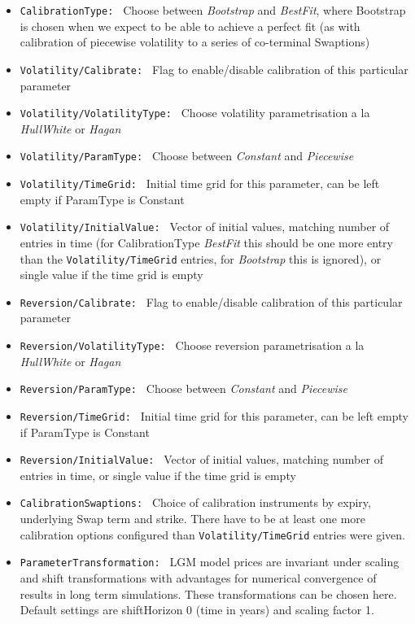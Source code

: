 \documentclass[12pt, a4paper]{article}
\begin{document}
{\begin{itemize}
\item {\tt CalibrationType: } Choose between {\em Bootstrap} and {\em BestFit}, where Bootstrap is chosen when we expect
to be able to achieve a perfect fit (as with calibration of piecewise volatility to a series of co-terminal Swaptions)
\item {\tt Volatility/Calibrate: } Flag to enable/disable calibration of this particular parameter
\item {\tt Volatility/VolatilityType: } Choose volatility parametrisation a la {\em HullWhite} or {\em Hagan}
\item {\tt Volatility/ParamType: } Choose between {\em Constant} and {\em Piecewise}
\item {\tt Volatility/TimeGrid: } Initial time grid for this parameter, can be left empty if ParamType is Constant
\item {\tt Volatility/InitialValue: } Vector of initial values, matching number of entries in time (for CalibrationType {\em BestFit} this should be one more entry than the {\tt Volatility/TimeGrid} entries, for {\em Bootstrap} this is ignored), or single value if the time grid is empty
\item {\tt Reversion/Calibrate: } Flag to enable/disable calibration of this particular parameter
\item {\tt Reversion/VolatilityType: } Choose reversion parametrisation a la {\em HullWhite} or {\em Hagan}
\item {\tt Reversion/ParamType: } Choose between {\em Constant} and {\em Piecewise}
\item {\tt Reversion/TimeGrid: } Initial time grid for this parameter, can be left empty if ParamType is Constant
\item {\tt Reversion/InitialValue: } Vector of initial values, matching number of entries in time, or single value if
the time grid is empty
\item {\tt CalibrationSwaptions: } Choice of calibration instruments by expiry, underlying Swap term and strike. There have to be at least one more calibration options configured than {\tt Volatility/TimeGrid} entries were given.
\item {\tt ParameterTransformation: } LGM model prices are invariant under scaling and shift transformations
\cite{Lichters} with advantages for numerical convergence of results in long term simulations. These transformations can
be chosen here. Default settings are shiftHorizon 0 (time in years) and scaling factor 1.
\end{itemize}

}
\end{document}
